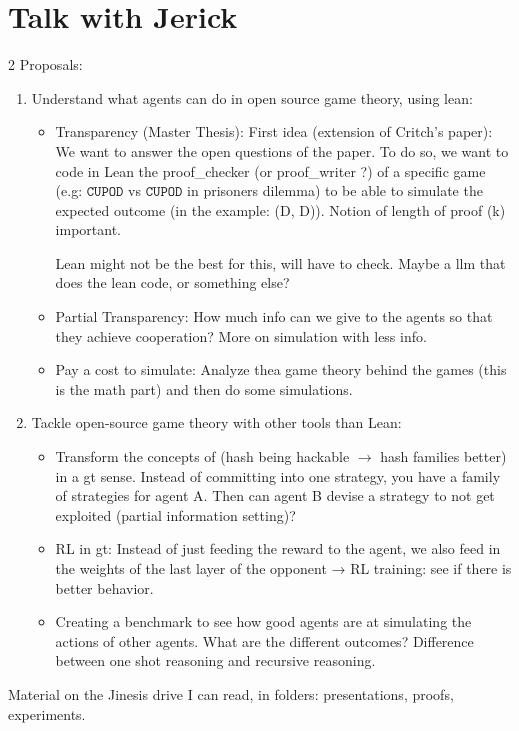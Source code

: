 \documentclass{article}
\newcommand{\cupod}{\texttt{CUPOD}}
\begin{document}
\section{Talk with Jerick}
2 Proposals: 
\begin{enumerate}
    \item Understand what agents can do in open source game theory, using lean:
    \begin{itemize}
        \item Transparency (Master Thesis): First idea (extension of Critch's paper): We want to answer the open questions of the paper. To do so, we want to code in Lean the proof\_checker (or proof\_writer ?) of a specific game (e.g: $\cupod$ vs $\cupod$ in prisoners dilemma) to be able to simulate the expected outcome (in the example: (D, D)). Notion of length of proof (k) important.
        
        Lean might not be the best for this, will have to check. Maybe a llm that does the lean code, or something else?      
        
        \item Partial Transparency: How much info can we give to the agents so that they achieve cooperation? More on simulation with less info.
        \item Pay a cost to simulate: Analyze thea game theory behind the games (this is the math part) and then do some simulations.
    \end{itemize}
    \item Tackle open-source game theory with other tools than Lean:
    \begin{itemize}
    \item Transform the concepts of (hash being hackable $\to$ hash families better) in a gt sense.
    Instead of committing into one strategy, you have a family of strategies for agent A. Then can agent B devise a strategy to not get exploited (partial information setting)?
    \item RL in gt: Instead of just feeding the reward to the agent, we also feed in the weights of the last layer of the opponent → RL training: see if there is better behavior.
    \item Creating a benchmark to see how good agents are at simulating the actions of other agents. What are the different outcomes? Difference between one shot reasoning and recursive reasoning.
\end{itemize}
\end{enumerate}


Material on the Jinesis drive I can read, in folders: presentations, proofs, experiments.
\end{document}
